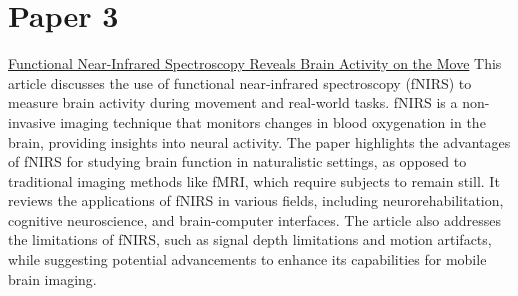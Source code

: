 \documentclass[12pt]{article}
\begin{document}
\section{Paper 3}
\href{https://www.ncbi.nlm.nih.gov/pmc/articles/PMC9231602/}{Functional Near-Infrared Spectroscopy Reveals Brain Activity on the Move}
This article discusses the use of functional near-infrared spectroscopy (fNIRS) to measure brain activity during movement and real-world tasks. fNIRS is a non-invasive imaging technique that monitors changes in blood oxygenation in the brain, providing insights into neural activity. The paper highlights the advantages of fNIRS for studying brain function in naturalistic settings, as opposed to traditional imaging methods like fMRI, which require subjects to remain still. It reviews the applications of fNIRS in various fields, including neurorehabilitation, cognitive neuroscience, and brain-computer interfaces. The article also addresses the limitations of fNIRS, such as signal depth limitations and motion artifacts, while suggesting potential advancements to enhance its capabilities for mobile brain imaging.
\end{document}
